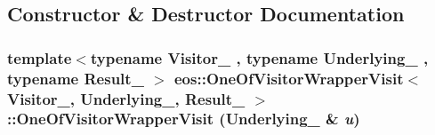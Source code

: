 \subsection{Constructor \& Destructor Documentation}
\hypertarget{structeos_1_1OneOfVisitorWrapperVisit_3_01Visitor___00_01Underlying___00_01Result___01_4_a568f043401c51749bbdd08a5eab78f1f}{
\subsubsection[{OneOfVisitorWrapperVisit}]{\setlength{\rightskip}{0pt plus 5cm}template$<$typename Visitor\_\- , typename Underlying\_\- , typename Result\_\- $>$ eos::OneOfVisitorWrapperVisit$<$ Visitor\_\-, Underlying\_\-, Result\_\- $>$::OneOfVisitorWrapperVisit (Underlying\_\- \& {\em u})}}
\label{structeos_1_1OneOfVisitorWrapperVisit_3_01Visitor___00_01Underlying___00_01Result___01_4_a568f043401c51749bbdd08a5eab78f1f}


